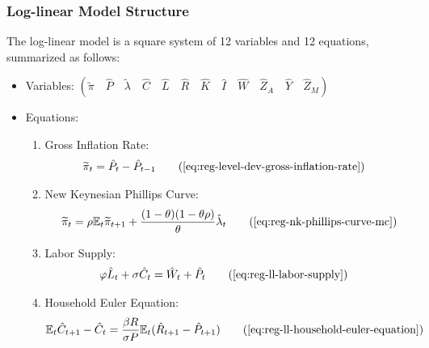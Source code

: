 \documentclass[
	thesis.tex
	]{subfiles}
\begin{document}


\subsubsection{Log-linear Model Structure}

The log-linear model is a square system of 12 variables and 12 equations, summarized as follows:

{\singlespacing
	
	\begin{itemize}
		
		\item Variables: \( \left( \tilde{\pi} \quad \hat{P} \quad \tilde{\lambda} \quad \hat{C} \quad \hat{L} \quad \hat{R} \quad \hat{K} \quad \hat{I} \quad \hat{W} \quad \hat{Z}_A \quad \hat{Y} \quad \hat{Z}_M \right) \)
		
		\item Equations:
		
		\begin{enumerate}
			
			\item Gross Inflation Rate:
			\begin{align}
				\widetilde{\pi}_t &= \hat{P}_t - \hat{P}_{t-1}
				\tag{\ref{eq:reg-level-dev-gross-inflation-rate}}
			\end{align}
			
			\item New Keynesian Phillips Curve:
			\begin{align}
				\widetilde{\pi}_t = \rho \E \widetilde{\pi}_{t+1} + \frac{(1-\theta) (1- \theta \rho)}{\theta} \hat{\lambda}_t
				\tag{\ref{eq:reg-nk-phillips-curve-mc}}
			\end{align}
			
			\item Labor Supply:
			\begin{align}
				\varphi \hat{L}_t + \sigma \hat{C}_t &= \hat{W}_t + \hat{P}_t
				\tag{\ref{eq:reg-ll-labor-supply}}
			\end{align}
			
			\item Household Euler Equation:
			\begin{align}
				\E \hat{C}_{t+1} - \hat{C}_t &= \frac{\beta R}{\sigma P} \E(\hat{R}_{t+1} - \hat{P}_{t+1})
				\tag{\ref{eq:reg-ll-household-euler-equation}}
			\end{align}
			

\end{enumerate}
\end{itemize}}
\end{document}
